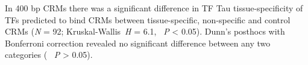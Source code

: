 \documentclass[../main.tex]{subfiles}
\begin{document}
In 400 bp CRMs there was a significant difference in TF Tau tissue\hyp{}specificity of TFs predicted to bind CRMs between tissue\hyp{}specific, non\hyp{}specific and control CRMs (\textit{N} = 92; Kruskal\hyp{}Wallis~\textit{H} = 6.1, ~\textit{P} \textless{} 0.05).
Dunn's posthocs with Bonferroni correction revealed no significant difference between any two categories ( ~\textit{P} \textgreater{} 0.05).










\end{document}
